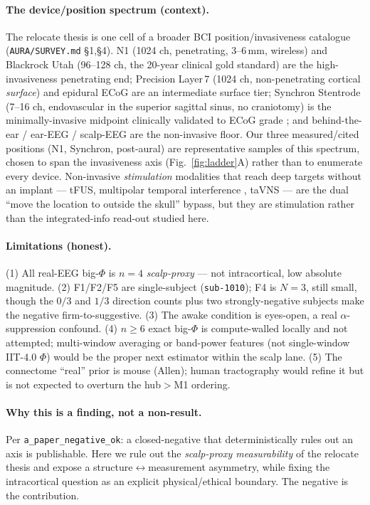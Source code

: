 \documentclass[11pt,a4paper]{article}
\begin{document}
\paragraph{The device/position spectrum (context).}
The relocate thesis is one cell of a broader BCI position/invasiveness
catalogue (\texttt{AURA/SURVEY.md} \S1,\S4). N1 (1024 ch, penetrating,
$3$--$6\,$mm, wireless) and Blackrock Utah (96--128 ch, the 20-year clinical
gold standard) are the high-invasiveness penetrating end; Precision Layer\,7
(1024 ch, non-penetrating cortical \emph{surface}) and epidural ECoG are an
intermediate surface tier; Synchron Stentrode (7--16 ch, endovascular in the
superior sagittal sinus, no craniotomy) is the minimally-invasive midpoint
clinically validated to ECoG grade \citep{john2018endovascular,
synchron2025command}; and behind-the-ear / ear-EEG / scalp-EEG are the
non-invasive floor. Our three measured/cited positions (N1, Synchron,
post-aural) are representative samples of this spectrum, chosen to span the
invasiveness axis (Fig.~\ref{fig:ladder}A) rather than to enumerate every
device. Non-invasive \emph{stimulation} modalities that reach deep targets
without an implant --- tFUS, multipolar temporal interference
\citep{grossman2017ti}, taVNS --- are the dual ``move the location to outside
the skull'' bypass, but they are stimulation rather than the integrated-info
read-out studied here.

\paragraph{Limitations (honest).}
(1) All real-EEG big-$\Phi$ is $n{=}4$ \emph{scalp-proxy} --- not intracortical,
low absolute magnitude. (2) F1/F2/F5 are single-subject (\texttt{sub-1010});
F4 is $N{=}3$, still small, though the $0/3$ and $1/3$ direction counts plus two
strongly-negative subjects make the negative firm-to-suggestive. (3) The awake
condition is eyes-open, a real $\alpha$-suppression confound. (4) $n{\ge}6$
exact big-$\Phi$ is compute-walled locally and not attempted; multi-window
averaging or band-power features (not single-window IIT-4.0 $\Phi$) would be
the proper next estimator within the scalp lane. (5) The connectome ``real''
prior is mouse (Allen); human tractography would refine it but is not expected
to overturn the hub$>$M1 ordering.

\paragraph{Why this is a finding, not a non-result.}
Per \texttt{a\_paper\_negative\_ok}: a closed-negative that deterministically
rules out an axis is publishable. Here we rule out the \emph{scalp-proxy
measurability} of the relocate thesis and expose a structure$\leftrightarrow$measurement
asymmetry, while fixing the intracortical question as an explicit physical/ethical
boundary. The negative is the contribution.
\end{document}
